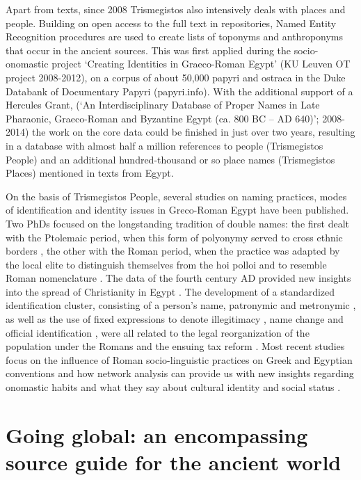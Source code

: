 \documentclass[amsthm,ebook]{saparticle}
\begin{document}
Apart from texts, since 2008 Trismegistos also intensively deals with places and people. Building on open access to the
full text in repositories, Named Entity Recognition procedures are used to create lists of toponyms and anthroponyms
that occur in the ancient sources. This was first applied during the socio-onomastic project `Creating Identities in
Graeco-Roman Egypt' (KU Leuven OT project 2008-2012), on a corpus of about 50,000 papyri and ostraca in the Duke
Databank of Documentary Papyri (papyri.info). With the additional support of a Hercules Grant, (`An Interdisciplinary
Database of Proper Names in Late Pharaonic, Graeco-Roman and Byzantine Egypt (ca. 800 BC – AD 640)'; 2008-2014) the
work on the core data could be finished in just over two years, resulting in a database with almost half a million
references to people (Trismegistos People) and an additional hundred-thousand or so place names (Trismegistos Places)
mentioned in texts from Egypt.

On the basis of Trismegistos People, several studies on naming practices, modes of identification and identity issues in
Greco-Roman Egypt have been published. Two PhDs focused on the longstanding tradition of double names: the first dealt
with the Ptolemaic period, when this form of polyonymy served to cross ethnic borders \citep{Coussement}, the
other with the Roman period, when the practice was adapted by the local elite to distinguish themselves from the hoi
polloi and to resemble Roman nomenclature \citep{Broux2015a}. The data of the fourth century AD provided new insights into
the spread of Christianity in Egypt \citep{Depauw2013}. The development of a standardized identification
cluster, consisting of a person's name, patronymic and metronymic \citep{BrouxDepauw}, as well as the use of fixed
expressions to denote illegitimacy \citep{Broux2015b}, name change \citep{Broux2013a} and official identification \citep{Broux2010}, were all related to the legal reorganization of the population under the Romans and the
ensuing tax reform \citep{Broux2013b}. Most recent studies focus on the influence of Roman socio-linguistic practices on
Greek and Egyptian conventions \citep{Depauw} and how network analysis can provide us with new insights regarding
onomastic habits and what they say about cultural identity and social status \citep{Broux2015c}.

\section{Going global: an encompassing source guide for the ancient world}
\end{document}
